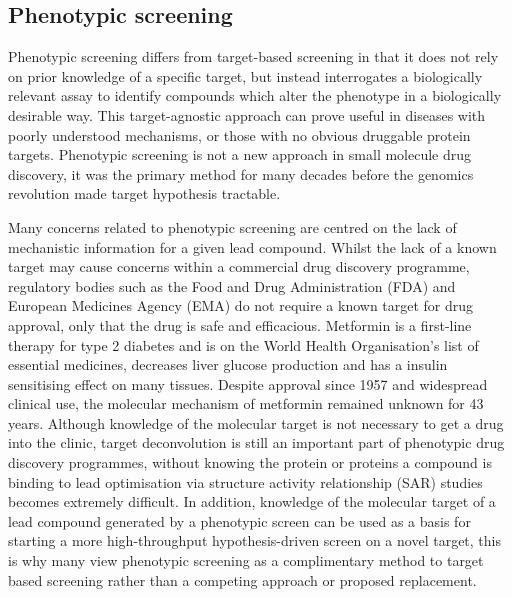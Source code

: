 \documentclass[a4paper,11pt,twoside,openright]{scrbook}
\begin{document}

\subsection{Phenotypic screening}
Phenotypic screening differs from target-based screening in that it does not rely on prior knowledge of a specific target, but instead interrogates a biologically relevant assay to identify compounds which alter the phenotype in a biologically desirable way.
This target-agnostic approach can prove useful in diseases with poorly understood mechanisms, or those with no obvious druggable protein targets.
Phenotypic screening is not a new approach in small molecule drug discovery, it was the primary method for many decades before the genomics revolution made target hypothesis tractable.
\cite{Zheng2013}


Many concerns related to phenotypic screening are centred on the lack of mechanistic information for a given lead compound.
Whilst the lack of a known target may cause concerns within a commercial drug discovery programme, regulatory bodies such as the Food and Drug Administration (FDA) and European Medicines Agency (EMA) do not require a known target for drug approval, only that the drug is safe and efficacious.
Metformin is a first-line therapy for type 2 diabetes and is on the World Health Organisation's list of essential medicines, decreases liver glucose production and has a insulin sensitising effect on many tissues.
Despite approval since 1957 and widespread clinical use, the  molecular mechanism of metformin remained unknown for 43 years. \cite{Hundal2000}
Although knowledge of the molecular target is not necessary to get a drug into the clinic, target deconvolution is still an important part of phenotypic drug discovery programmes, without knowing the protein or proteins a compound is binding to lead optimisation via structure activity relationship (SAR) studies becomes extremely difficult.
In addition, knowledge of the molecular target of a lead compound generated by a phenotypic screen can be used as a basis for starting a more high-throughput hypothesis-driven screen on a novel target, this is why many view phenotypic screening as a complimentary method to target based screening rather than a competing approach or proposed replacement.
\end{document}
